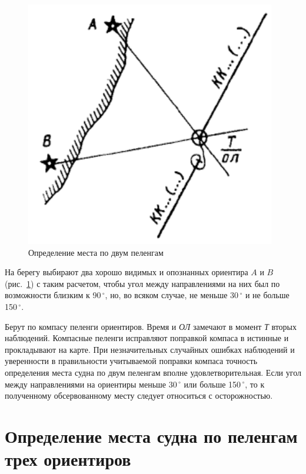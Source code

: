 \documentclass[a4paper, 12pt, twoside, final, book, russian, fittopage, cyremdash]{ncc}
\newcommand{\gr}{\ensuremath{\,^\circ}\xspace}
\newcommand{\ris}[1]{\ref{fig:#1}}
\begin{document}
\begin{figure}[htb]
  \centering{}
  \includegraphics{N041}
  \caption{Определение места по двум пеленгам}
  \label{fig:N41}
\end{figure}

На берегу выбирают два хорошо видимых и опознанных ориентира $A$ и $B$ (рис.~\ris{N41}) с таким расчетом, чтобы угол между направлениями на них был по возможности близким к 90\gr, но, во всяком случае, не меньше 30\gr и не больше 150\gr. 

Берут по компасу пеленги ориентиров. Время и \textit{ОЛ} замечают в момент \textit{Т} вторых наблюдений. Компасные пеленги исправляют поправкой компаса в истинные и прокладывают на карте. При незначительных случайных ошибках наблюдений и уверенности в правильности учитываемой поправки компаса точность определения места судна по двум пеленгам вполне удовлетворительная. Если угол между направлениями на ориентиры меньше 30\gr или больше 150\gr, то к полученному обсервованному месту следует относиться с осторожностью. 

\section{Определение места судна по пеленгам трех ориентиров}
\end{document}
